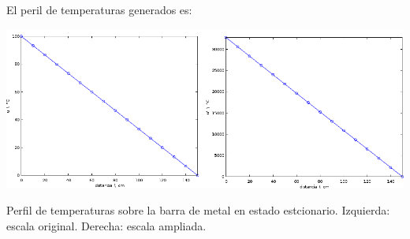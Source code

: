 \documentclass[a4paper,10pt]{article}
\begin{document}
El peril de temperaturas generados es:

\begin{minipage}[h!bt]
    \centering
    \includegraphics[scale=0.5]{u.png}
    \label{fig:secondlabel}
\end{minipage}

Perfil de temperaturas sobre la barra de metal en estado estcionario. Izquierda: escala original. Derecha: escala ampliada.
\end{document}
